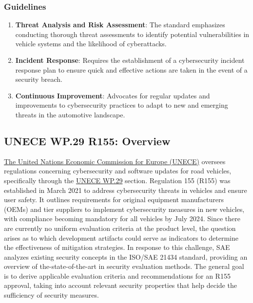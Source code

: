 \subsubsection{Guidelines}\label{subsubsec:guidelines}
\begin{enumerate}
    \item \textbf{Threat Analysis and Risk Assessment}: The standard emphasizes conducting thorough threat assessments to identify potential vulnerabilities in vehicle systems and the likelihood of cyberattacks.
    \item \textbf{Incident Response}: Requires the establishment of a cybersecurity incident response plan to ensure quick and effective actions are taken in the event of a security breach.
    \item \textbf{Continuous Improvement}: Advocates for regular updates and improvements to cybersecurity practices to adapt to new and emerging threats in the automotive landscape.
\end{enumerate}

\subsection{UNECE WP.29 R155: Overview}\label{subsec:unece-wp-29-r155}

\href{https://unece.org/}{The United Nations Economic Commission for Europe (UNECE)} oversees regulations concerning cybersecurity and software updates for road vehicles, specifically through the
\href{https://unece.org/wp29-introduction}{UNECE WP.29} section.
Regulation 155 (R155) was established in March 2021 to address cybersecurity threats in vehicles and ensure user safety.
It outlines requirements for original equipment manufacturers (OEMs) and tier suppliers to implement cybersecurity measures in new vehicles,
with compliance becoming mandatory for all vehicles by July 2024.
Since there are currently no uniform evaluation criteria at the product level, the question arises as to which development artifacts could serve as indicators to determine the effectiveness of mitigation strategies.
In response to this challenge, SAE analyzes existing security concepts in the ISO/SAE 21434 standard, providing an overview of the-state-of-the-art in security evaluation methods.
The general goal is to derive applicable evaluation criteria and recommendations for an R155 approval,
taking into account relevant security properties that help decide the sufficiency of security measures\cite{hellstern2024cybersecurity}.

